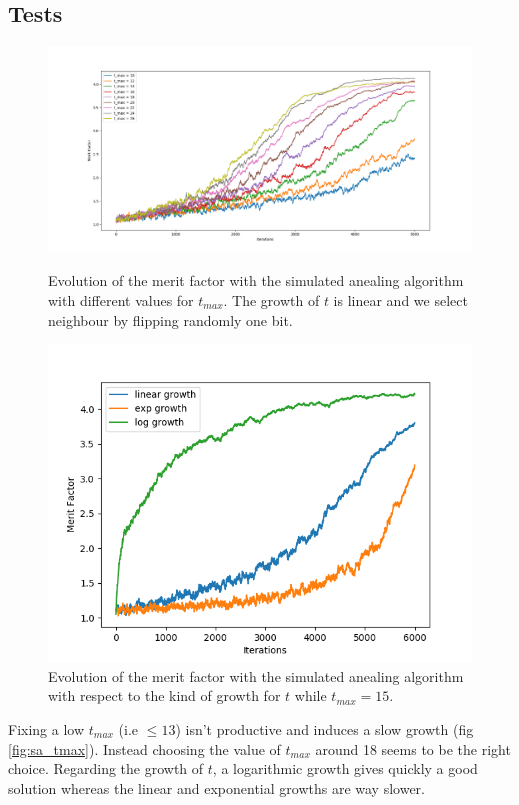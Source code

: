 \documentclass[a4paper,11pt,openany]{article}
\begin{document}
\subsection{Tests}
\begin{figure}[H]
\centering
\begin{minipage}{.45\textwidth}
  \begin{center}
  \includegraphics[scale=0.23]{Images/sa_tmax}
  \caption{Evolution of the merit factor with the simulated anealing algorithm with different values for $t_{max}$. The growth of $t$ is linear and we select neighbour by flipping randomly one bit.}
  \label{fig:sa_tmax}
  \end{center}
\end{minipage}%
\hfill
\begin{minipage}{.45\textwidth}
  \begin{center}
  \includegraphics[scale=0.4]{Images/sa_growth}
  \caption{Evolution of the merit factor with the simulated anealing algorithm with respect to the kind of growth for $t$ while $t_{max}=15$.}
  \label{fig:sa_growth}
  \end{center}
\end{minipage}
\end{figure}
\noindent
Fixing a low $t_{max}$ (i.e $\leq 13$) isn't productive and induces a slow growth (fig \ref{fig:sa_tmax}). Instead choosing the value of $t_{max}$ around 18 seems to be the right choice. Regarding the growth of $t$, a logarithmic growth gives quickly a good solution whereas the linear and exponential growths are way slower.
\end{document}
